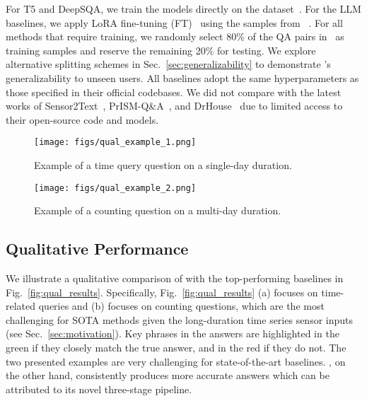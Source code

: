 For T5 and DeepSQA, we train the models directly on the \Dataset dataset~\citesensorqa.
For the LLM baselines, we apply LoRA fine-tuning (FT)~\cite{hu2021lora} using the samples from \Dataset~\citesensorqa. 
For all methods that require training, we randomly select 80\% of the QA pairs in \Dataset~\citesensorqa as training samples and reserve the remaining 20\% for testing. We explore alternative splitting schemes in Sec.~\ref{sec:generalizability} to demonstrate \Method's generalizability to unseen users.
All baselines adopt the same hyperparameters as those specified in their official codebases.
%
We did not compare with the latest works of Sensor2Text~\cite{chen2024sensor2text}, PrISM-Q\&A~\cite{arakawa2024prism}, and DrHouse~\cite{yang2024drhouse} due to limited access to their open-source code and models.



\begin{figure*}[tb]
  \centering
  \begin{subfigure}[b]{0.82\textwidth}
        \centering
        \texttt{[image: figs/qual\_example\_1.png]}
        \vspace{-6mm}
        \caption{Example of a time query question on a single-day duration.}
        \label{fig:qual-daily}
    \end{subfigure}
    
    \begin{subfigure}[b]{0.82\textwidth}
        \centering
        \texttt{[image: figs/qual\_example\_2.png]}
        \vspace{-6mm}
        \caption{Example of a counting question on a multi-day duration.}
        \label{fig:qual-week}
    \end{subfigure}
  \vspace{-4mm}
  \caption{Qualitative results of \Method in comparison to state-of-the-art methods.}
  \vspace{-6mm}
  \label{fig:qual_results}
\end{figure*}




\subsection{Qualitative Performance}
\label{sec:qualitative}

We illustrate a qualitative comparison of \Method with the top-performing baselines in Fig.~\ref{fig:qual_results}. 
Specifically, Fig.~\ref{fig:qual_results} (a) focuses on time-related queries and (b) focuses on counting questions, which are the most challenging for SOTA methods given the long-duration time series sensor inputs (see Sec.~\ref{sec:motivation}).
Key phrases in the answers are highlighted in the green if they closely match the true answer, and in the red if they do not. The two presented examples are very challenging for state-of-the-art baselines. %
\Method, on the other hand, consistently produces more accurate answers which can be attributed to its novel three-stage pipeline.

